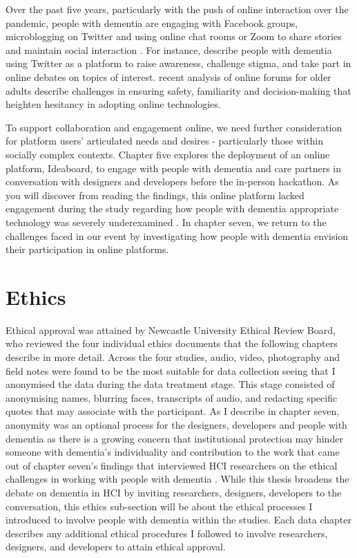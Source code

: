 Over the past five years, particularly with the push of online interaction over the pandemic, people with dementia are engaging with Facebook groups, microblogging on Twitter and using online chat rooms or Zoom to share stories and maintain social interaction \citep{lazar_safe_2019}. For instance, \cite{talbot_how_2020}describe people with dementia using Twitter as a platform to raise awareness, challenge stigma, and take part in online debates on topics of interest. \cite{johnson_older_2019} recent analysis of online forums for older adults describe challenges in ensuring safety, familiarity and decision-making that heighten hesitancy in adopting online technologies. 

To support collaboration and engagement online, we need further consideration for platform users' articulated needs and desires - particularly those within socially complex contexts. Chapter five explores the deployment of an online platform, Ideaboard, to engage with people with dementia and care partners in conversation with designers and developers before the in-person hackathon. As you will discover from reading the findings, this online platform lacked engagement during the study regarding how people with dementia appropriate technology was severely underexamined \citep{lindqvist2018contrasting} . In chapter seven, we return to the challenges faced in our event by investigating how people with dementia envision their participation in online platforms. 
\section{Ethics}
\label{Method:Ethics}
Ethical approval was attained by Newcastle University Ethical Review Board, who reviewed the four individual ethics documents that the following chapters describe in more detail. Across the four studies, audio, video, photography and field notes were found to be the most suitable for data collection seeing that I anonymised the data during the data treatment stage. This stage consisted of anonymising names, blurring faces, transcripts of audio, and redacting specific quotes that may associate with the participant. As I describe in chapter seven, anonymity was an optional process for the designers, developers and people with dementia as there is a growing concern that institutional protection may hinder someone with dementia's individuality and contribution to the work that came out of chapter seven's findings that interviewed HCI researchers on the ethical challenges in working with people with dementia \citep{hodge_relational_2020}. While this thesis broadens the debate on dementia in HCI by inviting researchers, designers, developers to the conversation, this ethics sub-section will be about the ethical processes I introduced to involve people with dementia within the studies. Each data chapter describes any additional ethical procedures I followed to involve researchers, designers, and developers to attain ethical approval.

